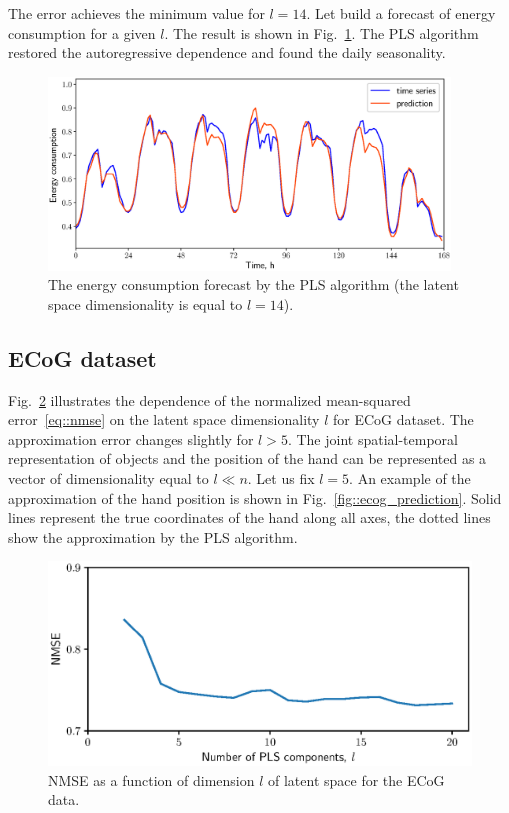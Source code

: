 \documentclass[12pt,twoside]{article}
\begin{document}
The error achieves the minimum value for $l=14$. 
Let build a forecast of energy consumption for a given $l$. 
The result is shown in Fig.~\ref{fig::energy_prediction}. 
The PLS algorithm restored the autoregressive dependence and found the daily seasonality.

\begin{figure}[!h]
	\centering
	\includegraphics[width=0.95\textwidth]{figs/energy_prediction}
	\caption{The energy consumption forecast by the PLS algorithm (the latent space dimensionality is equal to $l=14$).}
	\label{fig::energy_prediction}
\end{figure}

\subsection{ECoG dataset}
Fig.~\ref{fig::ecog_n_comp} illustrates the dependence of the normalized mean-squared error~\eqref{eq::nmse} on the latent space dimensionality $l$ for ECoG dataset. 
The approximation error changes slightly for $l > 5$.
The joint spatial-temporal representation of objects and the position of the hand can be represented as a vector of dimensionality equal to $l \ll n$.
Let us fix $l = 5$. 
An example of the approximation of the hand position is shown in Fig.~\ref{fig::ecog_prediction}. 
Solid lines represent the true coordinates of the hand along all axes, the dotted lines show the approximation by the PLS algorithm.
 
\begin{figure}[!h]
	\centering
	\includegraphics[width=0.75\linewidth]{figs/ecog_n_comp}	
	\caption{NMSE as a function of dimension $l$ of latent space for the ECoG data.}
	\label{fig::ecog_n_comp}
\end{figure}
\end{document}
